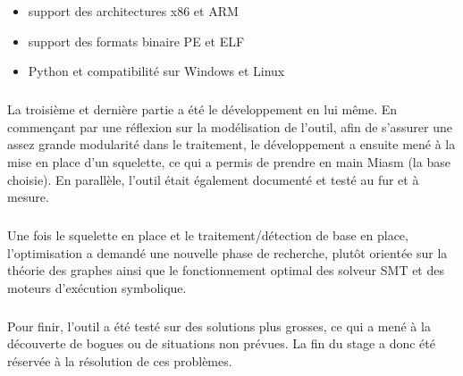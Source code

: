 \begin{itemize}
\item support des architectures x86 et ARM
\item support des formats binaire PE et ELF
\item Python et compatibilité sur Windows et Linux
\end{itemize}
\subparagraph{}
La troisième et dernière partie a été le développement en lui même. En commençant par une réflexion sur la modélisation de l'outil, afin de s'assurer une assez grande modularité dans le
traitement, le développement a ensuite mené à la mise en place d'un squelette, ce qui a permis de prendre en main Miasm (la base choisie). En parallèle, l'outil était également documenté et testé
au fur et à mesure.
\subparagraph{}
Une fois le squelette en place et le traitement/détection de base en place, l'optimisation a demandé une nouvelle phase de recherche, plutôt orientée sur la théorie des graphes ainsi que le
fonctionnement optimal des solveur SMT et des moteurs d'exécution symbolique.
\subparagraph{}
Pour finir, l'outil a été testé sur des solutions plus grosses, ce qui a mené à la découverte de bogues ou de situations non prévues. La fin du stage a donc été réservée à la résolution de
ces problèmes.
